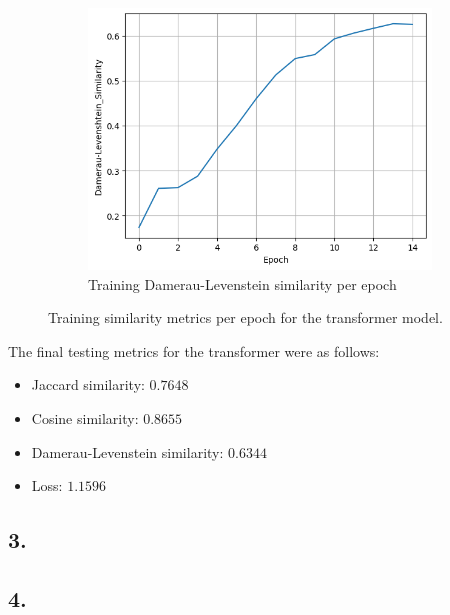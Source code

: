 \documentclass[11pt]{article}
\begin{document}
\begin{figure}[H]
\begin{subfigure}{.5\textwidth}
  \includegraphics[width=.9\linewidth]{plots/transformer_damerau-levenstein_similarity_per_epoch}
  \caption{Training Damerau-Levenstein similarity per epoch}
\end{subfigure}
\caption{Training similarity metrics per epoch for the transformer model.}
\label{fig:transformer_similarity_per_epoch}
\end{figure}

The final testing metrics for the transformer were as follows:
\begin{itemize}
    \item Jaccard similarity: $0.7648$
    \item Cosine similarity: $0.8655$
    \item Damerau-Levenstein similarity: $0.6344$
    \item Loss: $1.1596$
\end{itemize}

\subsection{3.}
\subsection{4.}
\end{document}
